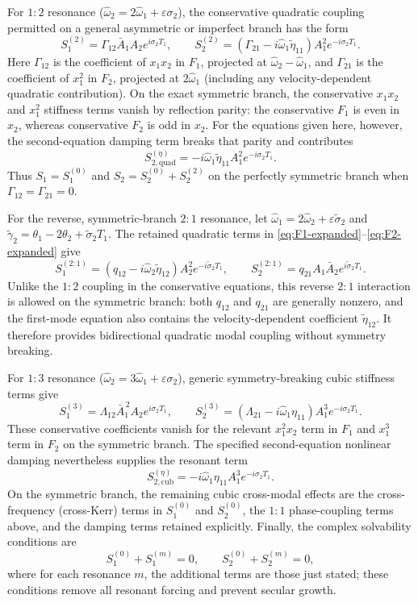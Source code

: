\documentclass[11pt]{article}
\begin{document}
For $1{:}2$ resonance ($\hat{\omega}_2=2\hat{\omega}_1+\varepsilon\sigma_2$), the conservative quadratic coupling permitted on a general asymmetric or imperfect branch has the form
\[
S_1^{(2)}=\Gamma_{12}\bar A_1A_2e^{i\sigma_2T_1},\qquad
S_2^{(2)}=\left(\Gamma_{21}-i\hat{\omega}_1\tilde{\eta}_{11}\right)A_1^2e^{-i\sigma_2T_1}.
\]
Here $\Gamma_{12}$ is the coefficient of $x_1x_2$ in $F_1$, projected at $\hat{\omega}_2-\hat{\omega}_1$, and $\Gamma_{21}$ is the coefficient of $x_1^2$ in $F_2$, projected at $2\hat{\omega}_1$ (including any velocity-dependent quadratic contribution). On the exact symmetric branch, the conservative $x_1x_2$ and $x_1^2$ stiffness terms vanish by reflection parity: the conservative $F_1$ is even in $x_2$, whereas conservative $F_2$ is odd in $x_2$. For the equations given here, however, the second-equation damping term breaks that parity and contributes
\[
S_{2,\mathrm{quad}}^{(\eta)}=-i\hat{\omega}_1\tilde{\eta}_{11}A_1^2e^{-i\sigma_2T_1}.
\]
Thus $S_1=S_1^{(0)}$ and $S_2=S_2^{(0)}+S_2^{(2)}$ on the perfectly symmetric branch when $\Gamma_{12}=\Gamma_{21}=0$.

For the reverse, symmetric-branch $2{:}1$ resonance, let $\hat{\omega}_1=2\hat{\omega}_2+\varepsilon\tilde{\sigma}_2$ and $\tilde{\gamma}_2=\theta_1-2\theta_2+\tilde{\sigma}_2T_1$. The retained quadratic terms in \eqref{eq:F1-expanded}--\eqref{eq:F2-expanded} give
\begin{equation}\label{eq:solvability-21}
S_1^{(2:1)}=(q_{12}-i\hat{\omega}_2\tilde{\eta}_{12})A_2^2e^{-i\tilde{\sigma}_2T_1},\qquad
S_2^{(2:1)}=q_{21}A_1\bar A_2e^{i\tilde{\sigma}_2T_1}.
\end{equation}
Unlike the $1{:}2$ coupling in the conservative equations, this reverse $2{:}1$ interaction is allowed on the symmetric branch: both $q_{12}$ and $q_{21}$ are generally nonzero, and the first-mode equation also contains the velocity-dependent coefficient $\tilde{\eta}_{12}$. It therefore provides bidirectional quadratic modal coupling without symmetry breaking.

For $1{:}3$ resonance ($\hat{\omega}_2=3\hat{\omega}_1+\varepsilon\sigma_2$), generic symmetry-breaking cubic stiffness terms give
\[
S_1^{(3)}=\Lambda_{12}\bar A_1^{\,2}A_2e^{i\sigma_2T_1},\qquad
S_2^{(3)}=(\Lambda_{21}-i\hat{\omega}_1\eta_{11})A_1^3e^{-i\sigma_2T_1}.
\]
These conservative coefficients vanish for the relevant $x_1^2x_2$ term in $F_1$ and $x_1^3$ term in $F_2$ on the symmetric branch. The specified second-equation nonlinear damping nevertheless supplies the resonant term
\[
S_{2,\mathrm{cub}}^{(\eta)}=-i\hat{\omega}_1\eta_{11}A_1^3e^{-i\sigma_2T_1}.
\]
On the symmetric branch, the remaining cubic cross-modal effects are the cross-frequency (cross-Kerr) terms in $S_1^{(0)}$ and $S_2^{(0)}$, the $1{:}1$ phase-coupling terms above, and the damping terms retained explicitly. Finally, the complex solvability conditions are
\begin{equation}\label{eq:solvability}
S_1^{(0)}+S_1^{(m)}=0,\qquad S_2^{(0)}+S_2^{(m)}=0,
\end{equation}
where for each resonance $m$, the additional terms are those just stated; these conditions remove all resonant forcing and prevent secular growth.
\end{document}
